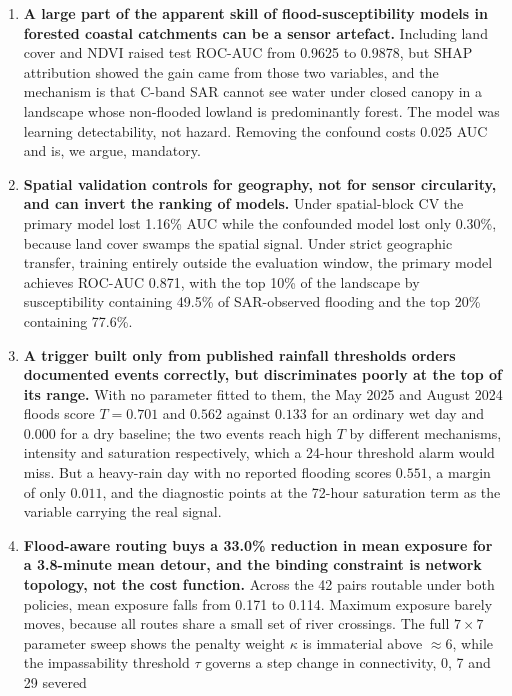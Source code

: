 \documentclass[10pt,twocolumn]{article}
\begin{document}
\begin{enumerate}
\itemsep3pt
\item \textbf{A large part of the apparent skill of flood-susceptibility models
      in forested coastal catchments can be a sensor artefact.} Including land
      cover and NDVI raised test ROC-AUC from 0.9625 to 0.9878, but SHAP
      attribution showed the gain came from those two variables, and the
      mechanism is that C-band SAR cannot see water under closed canopy in a
      landscape whose non-flooded lowland is predominantly forest. The model was
      learning detectability, not hazard. Removing the confound costs 0.025 AUC
      and is, we argue, mandatory.
\item \textbf{Spatial validation controls for geography, not for sensor
      circularity, and can invert the ranking of models.} Under spatial-block CV
      the primary model lost 1.16\% AUC while the confounded model lost only
      0.30\%, because land cover swamps the spatial signal. Under strict
      geographic transfer, training entirely outside the evaluation window, the
      primary model achieves ROC-AUC 0.871, with the top 10\% of the landscape by
      susceptibility containing 49.5\% of SAR-observed flooding and the top 20\%
      containing 77.6\%.
\item \textbf{A trigger built only from published rainfall thresholds orders
      documented events correctly, but discriminates poorly at the top of its
      range.} With no parameter fitted to them, the May 2025 and August 2024
      floods score $T=0.701$ and $0.562$ against $0.133$ for an ordinary wet day
      and $0.000$ for a dry baseline; the two events reach high $T$ by different
      mechanisms, intensity and saturation respectively, which a 24-hour
      threshold alarm would miss. But a heavy-rain day with no reported flooding
      scores $0.551$, a margin of only $0.011$, and the diagnostic points at the
      72-hour saturation term as the variable carrying the real signal.
\item \textbf{Flood-aware routing buys a 33.0\% reduction in mean exposure for a
      3.8-minute mean detour, and the binding constraint is network topology, not
      the cost function.} Across the 42 pairs routable under both policies,
      mean exposure falls from 0.171 to 0.114. Maximum exposure barely moves, because all routes share a small set
      of river crossings. The full $7\times7$ parameter sweep shows the penalty
      weight $\kappa$ is immaterial above $\approx6$, while the impassability
      threshold $\tau$ governs a step change in connectivity, 0, 7 and 29 severed

\end{enumerate}
\end{document}
